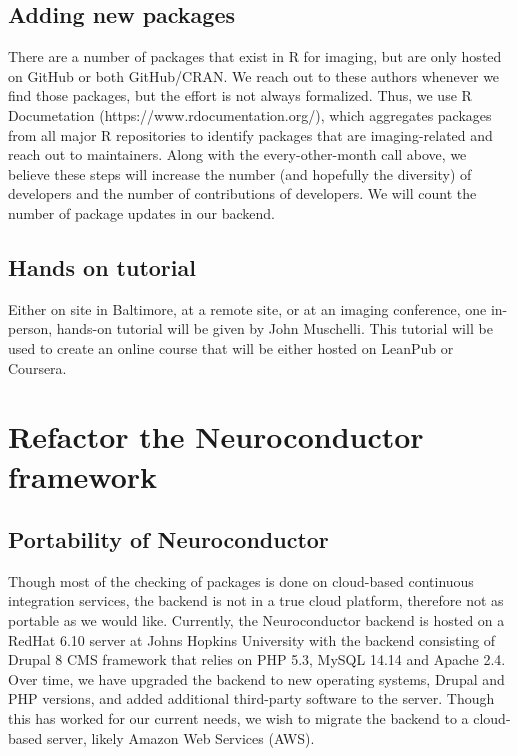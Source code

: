 \documentclass[]{elsarticle} %
\begin{document}
\subsection{Adding new packages}\label{adding-new-packages}

There are a number of packages that exist in R for imaging, but are only
hosted on GitHub or both GitHub/CRAN. We reach out to these authors
whenever we find those packages, but the effort is not always
formalized. Thus, we use R Documetation
(https://www.rdocumentation.org/), which aggregates packages from all
major R repositories to identify packages that are imaging-related and
reach out to maintainers. Along with the every-other-month call above,
we believe these steps will increase the number (and hopefully the
diversity) of developers and the number of contributions of developers.
We will count the number of package updates in our backend.

\subsection{Hands on tutorial}\label{hands-on-tutorial}

Either on site in Baltimore, at a remote site, or at an imaging
conference, one in-person, hands-on tutorial will be given by John
Muschelli. This tutorial will be used to create an online course that
will be either hosted on LeanPub or Coursera.

\section{Refactor the Neuroconductor
framework}\label{refactor-the-neuroconductor-framework}

\subsection{Portability of
Neuroconductor}\label{portability-of-neuroconductor}

Though most of the checking of packages is done on cloud-based
continuous integration services, the backend is not in a true cloud
platform, therefore not as portable as we would like. Currently, the
Neuroconductor backend is hosted on a RedHat 6.10 server at Johns
Hopkins University with the backend consisting of Drupal 8 CMS framework
that relies on PHP 5.3, MySQL 14.14 and Apache 2.4. Over time, we have
upgraded the backend to new operating systems, Drupal and PHP versions,
and added additional third-party software to the server. Though this has
worked for our current needs, we wish to migrate the backend to a
cloud-based server, likely Amazon Web Services (AWS).
\end{document}
